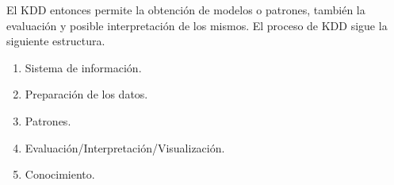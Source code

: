 \documentclass{article}
\begin{document}
El KDD entonces permite la obtención de modelos o patrones, también la evaluación y posible interpretación de los mismos. El proceso de KDD sigue la siguiente estructura.

\begin{enumerate}
  \item Sistema de información.
  \item Preparación de los datos.
  \item Patrones.
  \item Evaluación/Interpretación/Visualización.
  \item Conocimiento.
\end{enumerate}
\end{document}
